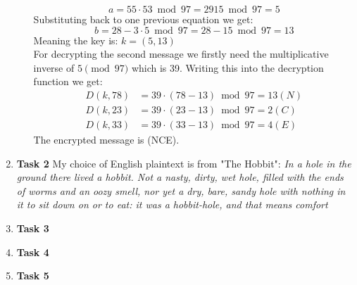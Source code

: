 \documentclass{article}
\begin{document}
\begin{enumerate}[label={}]
\begin{enumerate}
		\[a = 55 \cdot 53 \bmod 97 = 2915 \bmod 97 = 5\]
		Substituting back to one previous equation we get:
		\[b = 28 - 3 \cdot 5 \bmod 97 = 28 -15 \bmod 97 = 13\]
		Meaning the key is: $k = (5, 13)$\\
		For decrypting the second message we firstly need the multiplicative inverse of $5 \pmod 97$ which is 39. Writing this into the decryption function we get:
		\begin{align*}
			D(k, 78) &= 39 \cdot (78 - 13) \bmod 97 = 13 (N)\\
			D(k, 23) &= 39 \cdot (23 - 13) \bmod 97 = 2 (C)\\
			D(k, 33) &= 39 \cdot (33 - 13) \bmod 97 = 4 (E)
		\end{align*}
		The encrypted message is (NCE).
	\end{enumerate}
	\item \textbf{Task 2}
		My choice of English plaintext is from "The Hobbit":
		\textit{In a hole in the ground there lived a hobbit. Not a nasty, dirty, wet hole, filled with the ends of worms and an oozy smell, nor yet a dry, bare, sandy hole with nothing in it to sit down on or to eat: it was a hobbit-hole, and that means comfort}
	\item \textbf{Task 3}
	\item \textbf{Task 4}
	\item \textbf{Task 5}
\end{enumerate}
\end{document}

